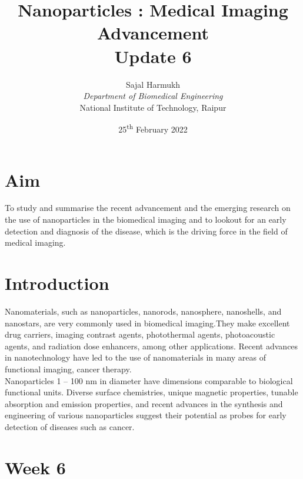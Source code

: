 \documentclass{article}
\title{\textbf{Nanoparticles : Medical Imaging Advancement\\Update 6}}
\author{Sajal Harmukh \\ \textit{Department of Biomedical Engineering} \\ National Institute of Technology, Raipur }
\date{25\textsuperscript{th} February 2022}
\begin{document}
\maketitle

\section*{Aim}
\large
To study and summarise the recent advancement and the emerging research on the use of nanoparticles in the biomedical imaging and to lookout for an early detection and diagnosis of the disease, which is the driving force in the field of medical imaging.

\section*{Introduction}
Nanomaterials, such as nanoparticles, nanorods, nanosphere, nanoshells, and nanostars, are
very commonly used in biomedical imaging.They make excellent drug carriers, imaging contrast agents, photothermal agents, photoacoustic agents, and radiation dose enhancers, among other applications. Recent advances in nanotechnology have led to the use of nanomaterials
in many areas of functional imaging, cancer therapy.\\ Nanoparticles 1 – 100 nm in diameter have dimensions comparable to biological functional units. Diverse surface chemistries, unique magnetic properties, tunable absorption and emission properties, and recent advances in the synthesis and engineering of various nanoparticles suggest their potential as probes for early detection of diseases such as cancer.
 


\section*{Week 6 }
\end{document}
